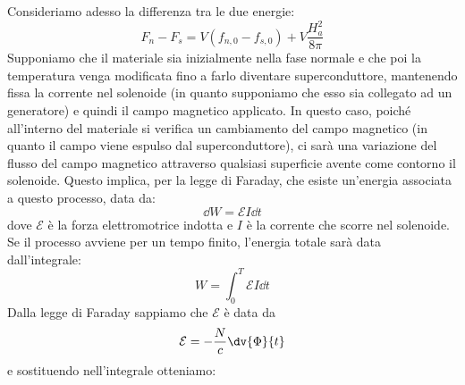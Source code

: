 Consideriamo adesso la differenza tra le due energie:
\begin{equation}
   F_n - F_s
   =V ( f_{n,0} - f_{s,0} ) + V \frac{H_a^2}{8\pi}
   \label{eq:differenza_energie_libere}
\end{equation}
Supponiamo che il materiale sia inizialmente nella fase normale e che poi la temperatura venga modificata fino a farlo diventare superconduttore, mantenendo fissa la corrente nel solenoide (in quanto supponiamo che esso sia collegato ad un generatore) e quindi il campo magnetico applicato. In questo caso, poiché all'interno del materiale si verifica un cambiamento del campo magnetico (in quanto il campo viene espulso dal superconduttore), ci sarà una variazione del flusso del campo magnetico attraverso qualsiasi superficie avente come contorno il solenoide. Questo implica, per la legge di Faraday, che esiste un'energia associata a questo processo, data da:
\begin{equation*}
   \dd{W}=\mathcal{E} I \dd{t}
\end{equation*}
dove $\mathcal{E}$ è la forza elettromotrice indotta e $I$ è la corrente che scorre nel solenoide. Se il processo avviene per un tempo finito, l'energia totale sarà data dall'integrale:
\begin{equation*}
   W=\int_{0}^{T} \mathcal{E} I \dd{t}
\end{equation*}
Dalla legge di Faraday sappiamo che $\mathcal{E}$ è data da
\begin{equation*}
   \mathcal{E}
   =-\frac{N}{c} \dv{\Phi}{t}
\end{equation*}
e sostituendo nell'integrale otteniamo:
